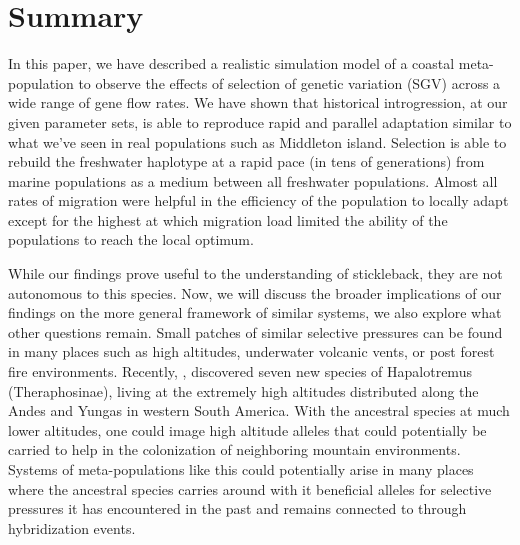 \documentclass{article}
\begin{document}

\section*{Summary}
 
In this paper, we have described a realistic simulation model of a coastal meta-population to observe the effects of selection of genetic variation (SGV) across a wide range of gene flow rates.
We have shown that historical introgression, at our given parameter sets, is able to reproduce rapid and parallel adaptation similar to what we've seen in real populations such as Middleton island. 
Selection is able to rebuild the freshwater haplotype at a rapid pace (in tens of generations) from marine populations as a medium between all freshwater populations. 
Almost all rates of migration were helpful in the efficiency of the population to locally adapt except for the highest at which migration load limited the ability of the populations to reach the local optimum. 

While our findings prove useful to the understanding of stickleback, they are not autonomous to this species. 
Now, we will discuss the broader implications of our findings on the more general framework of similar systems, we also explore what other questions remain. 
Small patches of similar selective pressures can be found in many places such as high altitudes, underwater volcanic vents, or post forest fire environments. 
Recently,  \citep{Ferretti2018}, discovered seven new species of Hapalotremus (Theraphosinae), living at the extremely high altitudes distributed along the Andes and Yungas in western South America.
With the ancestral species at much lower altitudes, one could image high altitude alleles that could potentially be carried to help in the colonization of neighboring mountain environments. 
Systems of meta-populations like this could potentially arise in many places
where the ancestral species carries around with it beneficial alleles for selective pressures it has encountered in the past and remains connected to through hybridization events.
\end{document}
